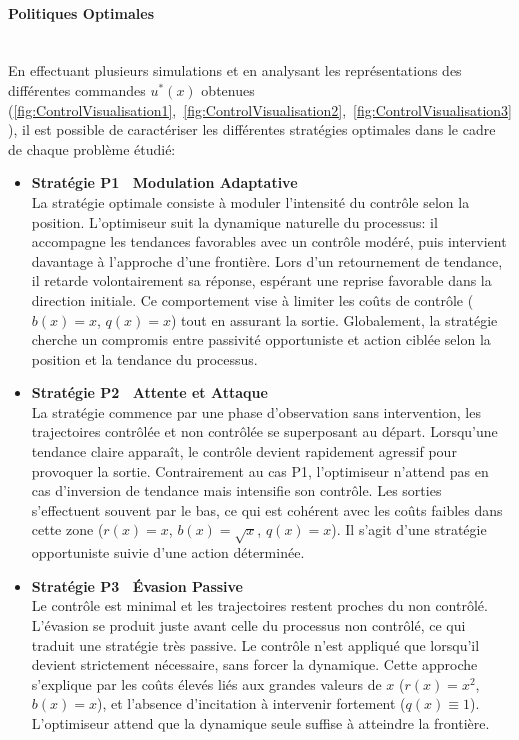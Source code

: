 \paragraph{Politiques Optimales}\phantom{}\\
En effectuant plusieurs simulations et en analysant les représentations des différentes commandes $u^*(x)$ obtenues (\ref{fig:ControlVisualisation1},~\ref{fig:ControlVisualisation2},~\ref{fig:ControlVisualisation3}), il est possible de caractériser les différentes stratégies optimales dans le cadre de chaque problème étudié:
\begin{itemize}
    \item \textbf{Stratégie P1 \textemdash~Modulation Adaptative}\\
    La stratégie optimale consiste à moduler l'intensité du contrôle selon la position. L'optimiseur suit la dynamique naturelle du processus: il accompagne les tendances favorables avec un contrôle modéré, puis intervient davantage à l'approche d'une frontière. Lors d'un retournement de tendance, il retarde volontairement sa réponse, espérant une reprise favorable dans la direction initiale. Ce comportement vise à limiter les coûts de contrôle (\( b(x) = x \), \( q(x) = x \)) tout en assurant la sortie. Globalement, la stratégie cherche un compromis entre passivité opportuniste et action ciblée selon la position et la tendance du processus.

    \item \textbf{Stratégie P2 \textemdash~Attente et Attaque}\\
    La stratégie commence par une phase d'observation sans intervention, les trajectoires contrôlée et non contrôlée se superposant au départ. Lorsqu'une tendance claire apparaît, le contrôle devient rapidement agressif pour provoquer la sortie. Contrairement au cas P1, l'optimiseur n'attend pas en cas d'inversion de tendance mais intensifie son contrôle. Les sorties s'effectuent souvent par le bas, ce qui est cohérent avec les coûts faibles dans cette zone (\( r(x) = x \), \( b(x) = \sqrt{x} \), \( q(x) = x \)). Il s'agit d'une stratégie opportuniste suivie d'une action déterminée.

    \item \textbf{Stratégie P3 \textemdash~Évasion Passive}\\
    Le contrôle est minimal et les trajectoires restent proches du non contrôlé. L'évasion se produit juste avant celle du processus non contrôlé, ce qui traduit une stratégie très passive. Le contrôle n'est appliqué que lorsqu'il devient strictement nécessaire, sans forcer la dynamique. Cette approche s'explique par les coûts élevés liés aux grandes valeurs de \( x \) (\( r(x) = x^2 \), \( b(x) = x \)), et l'absence d'incitation à intervenir fortement (\( q(x) \equiv 1 \)). L'optimiseur attend que la dynamique seule suffise à atteindre la frontière.
\end{itemize}

